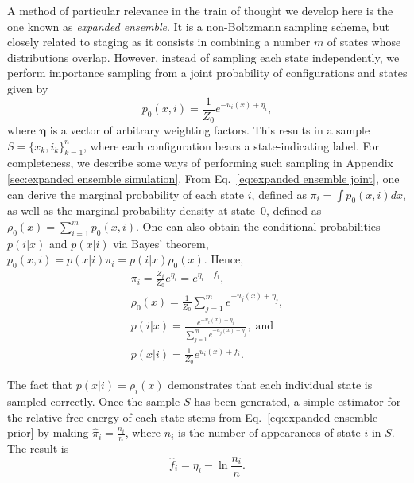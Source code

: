 \documentclass[aip,jcp,reprint,amsmath,amssymb]{revtex4-1}
\newcommand{\vt}[1]{\boldsymbol{\mathbf{#1}}}           %
\begin{document}
A method of particular relevance in the train of thought we develop here is the one known as \textit{expanded ensemble}.\cite{Lyubartsev_1992} It is a non-Boltzmann sampling scheme, but closely related to staging as it consists in combining a number $m$ of states whose distributions overlap. However, instead of sampling each state independently, we perform importance sampling from a joint probability of configurations and states given by\cite{Nymeyer_2010}
\begin{equation}
\label{eq:expanded ensemble joint}
p_0(x, i) = \frac{1}{Z_0} e^{-u_i(x) + \eta_i},
\end{equation}
where $\vt \eta$ is a vector of arbitrary weighting factors. This results in a sample $S = \{x_k,i_k\}_{k=1}^n$, where each configuration bears a state-indicating label. For completeness, we describe some ways of performing such sampling in Appendix \ref{sec:expanded ensemble simulation}. From Eq.~\eqref{eq:expanded ensemble joint}, one can derive the marginal probability of each state $i$, defined as $\pi_i = \int p_0(x,i)dx$, as well as the marginal probability density at state~$0$, defined as $\rho_0(x) = \sum_{i=1}^m p_0(x,i)$. One can also obtain the conditional probabilities $p(i|x)$ and $p(x|i)$ via Bayes' theorem, $p_0(x,i) = p(x|i) \pi_i = p(i|x) \rho_0(x)$. Hence,
\begin{subequations}
\label{eq:expanded ensemble probabilities}
\begin{gather}
\pi_i = \frac{Z_i}{Z_0} e^{\eta_i} = e^{\eta_i - f_i}, \label{eq:expanded ensemble prior} \\
\rho_0(x) = \frac{1}{Z_0} \sum_{j=1}^m e^{-u_j(x) + \eta_j}, \label{eq:expanded ensemble evidence} \\
p(i|x) = \frac{e^{-u_i(x) + \eta_i}}{\sum_{j=1}^m e^{-u_j(x) + \eta_j}}, \; \text{and} \label{eq:expanded ensemble posterior} \\
p(x|i) = \frac{1}{Z_0} e^{u_i(x) + f_i}. \label{eq:expanded ensemble likelihood}
\end{gather}
\end{subequations}

The fact that $p(x|i) = \rho_i(x)$ demonstrates that each individual state is sampled correctly. Once the sample $S$ has been generated, a simple estimator for the relative free energy of each state stems from Eq.~\eqref{eq:expanded ensemble prior} by making $\hat \pi_i = \frac{n_i}{n}$, where $n_i$ is the number of appearances of state $i$ in $S$. The result is
\begin{equation}
\label{eq:expanded ensemble histogram estimator}
\hat f_i = \eta_i - \ln \frac{n_i}{n}.
\end{equation}
\end{document}
